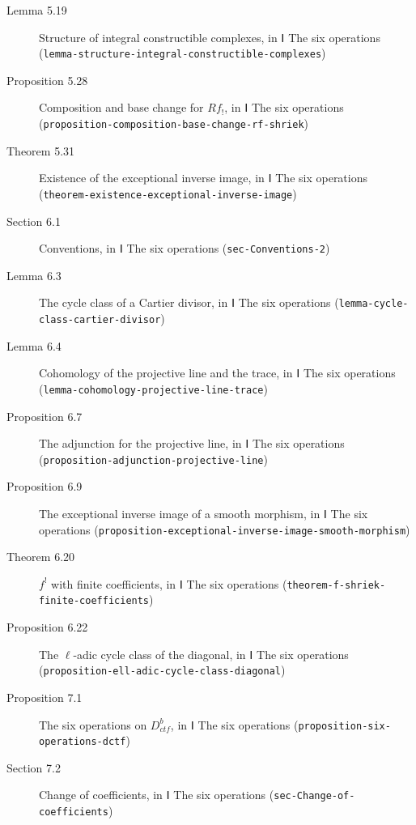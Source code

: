 \documentclass[11pt]{article}
\newcommand{\bpslug}[1]{\texttt{#1}}
\providecommand{\Dctf}{}\renewcommand{\Dctf}{D^b_{ctf}}
\begin{document}
\begin{description}
\item[Lemma 5.19] Structure of integral constructible complexes, in Ⅰ The six operations (\bpslug{lemma-{}\allowbreak{}structure-{}\allowbreak{}integral-{}\allowbreak{}constructible-{}\allowbreak{}complexes})
\item[Proposition 5.28] Composition and base change for $Rf_!$, in Ⅰ The six operations (\bpslug{proposition-{}\allowbreak{}composition-{}\allowbreak{}base-{}\allowbreak{}change-{}\allowbreak{}rf-{}\allowbreak{}shriek})
\item[Theorem 5.31] Existence of the exceptional inverse image, in Ⅰ The six operations (\bpslug{theorem-{}\allowbreak{}existence-{}\allowbreak{}exceptional-{}\allowbreak{}inverse-{}\allowbreak{}image})
\item[Section 6.1] Conventions, in Ⅰ The six operations (\bpslug{sec-{}\allowbreak{}Conventions-{}\allowbreak{}2})
\item[Lemma 6.3] The cycle class of a Cartier divisor, in Ⅰ The six operations (\bpslug{lemma-{}\allowbreak{}cycle-{}\allowbreak{}class-{}\allowbreak{}cartier-{}\allowbreak{}divisor})
\item[Lemma 6.4] Cohomology of the projective line and the trace, in Ⅰ The six operations (\bpslug{lemma-{}\allowbreak{}cohomology-{}\allowbreak{}projective-{}\allowbreak{}line-{}\allowbreak{}trace})
\item[Proposition 6.7] The adjunction for the projective line, in Ⅰ The six operations (\bpslug{proposition-{}\allowbreak{}adjunction-{}\allowbreak{}projective-{}\allowbreak{}line})
\item[Proposition 6.9] The exceptional inverse image of a smooth morphism, in Ⅰ The six operations (\bpslug{proposition-{}\allowbreak{}exceptional-{}\allowbreak{}inverse-{}\allowbreak{}image-{}\allowbreak{}smooth-{}\allowbreak{}morphism})
\item[Theorem 6.20] $f^!$ with finite coefficients, in Ⅰ The six operations (\bpslug{theorem-{}\allowbreak{}f-{}\allowbreak{}shriek-{}\allowbreak{}finite-{}\allowbreak{}coefficients})
\item[Proposition 6.22] The $\ell$-adic cycle class of the diagonal, in Ⅰ The six operations (\bpslug{proposition-{}\allowbreak{}ell-{}\allowbreak{}adic-{}\allowbreak{}cycle-{}\allowbreak{}class-{}\allowbreak{}diagonal})
\item[Proposition 7.1] The six operations on $\Dctf$, in Ⅰ The six operations (\bpslug{proposition-{}\allowbreak{}six-{}\allowbreak{}operations-{}\allowbreak{}dctf})
\item[Section 7.2] Change of coefficients, in Ⅰ The six operations (\bpslug{sec-{}\allowbreak{}Change-{}\allowbreak{}of-{}\allowbreak{}coefficients})

\end{description}
\end{document}
